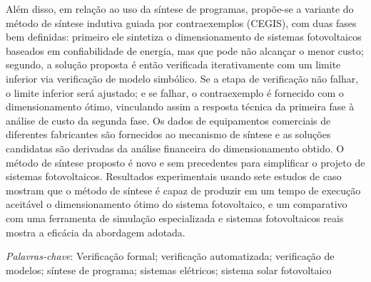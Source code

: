 Além disso, em relação ao uso da síntese de programas, propõe-se a variante do método de síntese indutiva guiada por contraexemplos (CEGIS), com duas fases bem definidas: primeiro ele sintetiza o dimensionamento de sistemas fotovoltaicos baseados em confiabilidade de energia, mas que pode não alcançar o menor custo; segundo, a solução proposta é então verificada iterativamente com um limite inferior via verificação de modelo simbólico. Se a etapa de verificação não falhar, o limite inferior será ajustado; e se falhar, o contraexemplo é fornecido com o dimensionamento ótimo, vinculando assim a resposta técnica da primeira fase à análise de custo da segunda fase. Os dados de equipamentos comerciais de diferentes fabricantes são fornecidos ao mecanismo de síntese e as soluções candidatas são derivadas da análise financeira do dimensionamento obtido. O método de síntese proposto é novo e sem precedentes para simplificar o projeto de sistemas fotovoltaicos. Resultados experimentais usando sete estudos de caso mostram que o método de síntese é capaz de produzir em um tempo de execução aceitável o dimensionamento ótimo do sistema fotovoltaico, e um comparativo com uma ferramenta de simulação especializada e sistemas fotovoltaicos reais mostra a eficácia da abordagem adotada.



\textit{Palavras-chave}: Verificação formal; verificação automatizada; verificação de modelos; síntese de programa; sistemas elétricos; sistema solar fotovoltaico